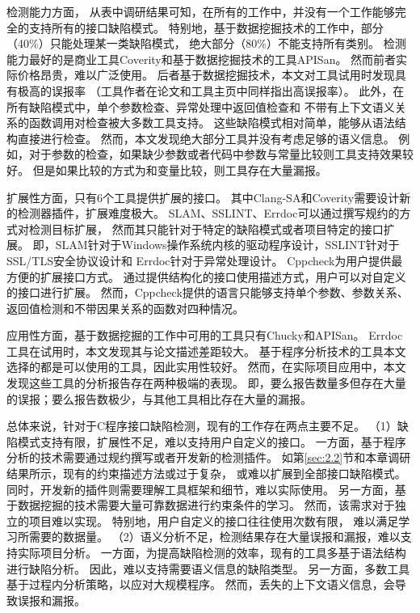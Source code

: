 检测能力方面，
从表中调研结果可知，在所有的工作中，并没有一个工作能够完全的支持所有的接口缺陷模式。
特别地，基于数据挖掘技术的工作中，部分（40\%）只能处理某一类缺陷模式，
绝大部分（80\%）不能支持所有类别。
检测能力最好的是商业工具Coverity和基于数据挖掘技术的工具APISan。
然而前者实际价格昂贵，难以广泛使用。
后者基于数据挖掘技术，本文对工具试用时发现具有极高的误报率
（工具作者在论文和工具主页中同样指出高误报率）。
此外，在所有缺陷模式中，单个参数检查、异常处理中返回值检查和
不带有上下文语义关系的函数调用对检查被大多数工具支持。
这些缺陷模式相对简单，能够从语法结构直接进行检查。
然而，本文发现绝大部分工具并没有考虑足够的语义信息。
例如，对于参数的检查，如果缺少参数或者代码中参数与常量比较则工具支持效果较好。
但是如果比较的方式为和变量比较，则工具存在大量漏报。

扩展性方面，只有6个工具提供扩展的接口。
其中Clang-SA和Coverity需要设计新的检测器插件，扩展难度极大。
SLAM、SSLINT、Errdoc可以通过撰写规约的方式对检测目标扩展，
然而其只能针对于特定的缺陷模式或者项目特定的接口扩展。
即，SLAM针对于Windows操作系统内核的驱动程序设计，SSLINT针对于SSL/TLS安全协议设计和
Errdoc针对于异常处理设计。
Cppcheck为用户提供最方便的扩展接口方式。
通过提供结构化的接口使用描述方式，用户可以对自定义的接口进行扩展。
然而，Cppcheck提供的语言只能够支持单个参数、参数关系、返回值检测和不带因果关系的函数对四种情况。

应用性方面，基于数据挖掘的工作中可用的工具只有Chucky和APISan。
Errdoc工具在试用时，本文发现其与论文描述差距较大。
基于程序分析技术的工具本文选择的都是可以使用的工具，因此实用性较好。
然而，在实际项目应用中，本文发现这些工具的分析报告存在两种极端的表现。
即，要么报告数量多但存在大量的误报；要么报告数极少，与其他工具相比存在大量的漏报。

总体来说，针对于C程序接口缺陷检测，现有的工作存在两点主要不足。
（1）缺陷模式支持有限，扩展性不足，难以支持用户自定义的接口。
一方面，基于程序分析的技术需要通过规约撰写或者开发新的检测插件。
如第\ref{sec:2.2}节和本章调研结果所示，现有的约束描述方法或过于复杂，
或难以扩展到全部接口缺陷模式。
同时，开发新的插件则需要理解工具框架和细节，难以实际使用。
另一方面，基于数据挖掘的技术需要大量可靠数据进行约束条件的学习。
然而，该需求对于独立的项目难以实现。
特别地，用户自定义的接口往往使用次数有限，
难以满足学习所需要的数据量。
（2）语义分析不足，检测结果存在大量误报和漏报，难以支持实际项目分析。
一方面，为提高缺陷检测的效率，现有的工具多基于语法结构进行缺陷分析。
因此，难以支持需要语义信息的缺陷类型。
另一方面，多数工具基于过程内分析策略，以应对大规模程序。
然而，丢失的上下文语义信息，会导致误报和漏报。

